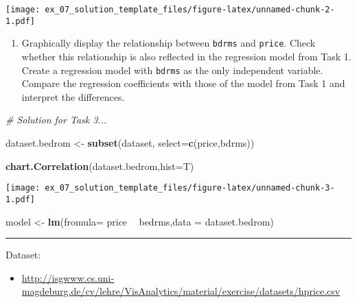 \documentclass[11pt,]{article}
\newenvironment{Shaded}{\begin{snugshade}}{\end{snugshade}}
\newcommand{\CommentTok}[1]{\textcolor[rgb]{0.56,0.35,0.01}{\textit{#1}}}
\newcommand{\DataTypeTok}[1]{\textcolor[rgb]{0.13,0.29,0.53}{#1}}
\newcommand{\KeywordTok}[1]{\textcolor[rgb]{0.13,0.29,0.53}{\textbf{#1}}}
\newcommand{\NormalTok}[1]{#1}
\newcommand{\OperatorTok}[1]{\textcolor[rgb]{0.81,0.36,0.00}{\textbf{#1}}}
\newcommand{\StringTok}[1]{\textcolor[rgb]{0.31,0.60,0.02}{#1}}
\providecommand{\tightlist}{%
  \setlength{\itemsep}{0pt}\setlength{\parskip}{0pt}}
\begin{document}
\texttt{[image: ex\_07\_solution\_template\_files/figure-latex/unnamed-chunk-2-1.pdf]}

\begin{enumerate}
\def\labelenumi{\arabic{enumi}.}
\setcounter{enumi}{2}
\tightlist
\item
  Graphically display the relationship between \texttt{bdrms} and
  \texttt{price}. Check whether this relationship is also reflected in
  the regression model from Task 1. Create a regression model with
  \texttt{bdrms} as the only independent variable. Compare the
  regression coefficients with those of the model from Task 1 and
  interpret the differences.
\end{enumerate}

\begin{Shaded}
\begin{Highlighting}[]
\CommentTok{# Solution for Task 3...}

\NormalTok{dataset.bedrom <-}\StringTok{ }\KeywordTok{subset}\NormalTok{(dataset, }\DataTypeTok{select=}\KeywordTok{c}\NormalTok{(price,bdrms))}

\KeywordTok{chart.Correlation}\NormalTok{(dataset.bedrom,}\DataTypeTok{hist=}\NormalTok{T)}
\end{Highlighting}
\end{Shaded}

\texttt{[image: ex\_07\_solution\_template\_files/figure-latex/unnamed-chunk-3-1.pdf]}

\begin{Shaded}
\begin{Highlighting}[]
\NormalTok{model <-}\StringTok{ }\KeywordTok{lm}\NormalTok{(}\DataTypeTok{fromula=}\NormalTok{ price }\OperatorTok{~}\StringTok{ }\NormalTok{bedrms,}\DataTypeTok{data =}\NormalTok{ dataset.bedrom)}
\end{Highlighting}
\end{Shaded}

\begin{center}\rule{0.5\linewidth}{\linethickness}\end{center}

Dataset:

\begin{itemize}
\tightlist
\item
  \url{http://isgwww.cs.uni-magdeburg.de/cv/lehre/VisAnalytics/material/exercise/datasets/hprice.csv}
\end{itemize}
\end{document}

